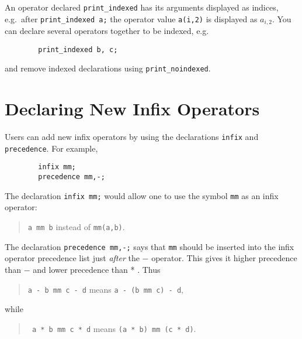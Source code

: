 \hypertarget{command:PRINT_INDEXED}{}\hypertarget{command:PRINT_NOINDEXED}{}

An operator declared
\texttt{print\_indexed} has
its arguments displayed as indices, e.g.\ after
\texttt{print\_indexed~a;} the operator value \texttt{a(i,2)} is
displayed as \(a_{i,2}\).  You can declare several operators together
to be indexed, e.g.
\begin{verbatim}
        print_indexed b, c;
\end{verbatim}
and remove indexed declarations using
\texttt{print\_noindexed}.


\section{Declaring New Infix Operators}
\hypertarget{command:INFIX}{}
\hypertarget{command:PRECEDENCE}{}

Users can add new infix operators by using the declarations
\texttt{infix} and
\texttt{precedence}.
For example,
\begin{verbatim}
        infix mm;
        precedence mm,-;
\end{verbatim}
The declaration \texttt{infix mm;} would allow one to use the symbol
\texttt{mm} as an infix operator:
\begin{quote}
\hspace{0.2in} \texttt{a mm b} \hspace{0.3in} instead of \hspace{0.3in}
\texttt{mm(a,b)}.
\end{quote}

The declaration \texttt{precedence mm,-;} says that \texttt{mm} should be
inserted into the infix operator precedence list just \emph{after}
the $-$ operator.  This gives it higher precedence than $-$ and lower
precedence than * .  Thus

\begin{quote}
\hspace{0.2in}\texttt{a - b mm c - d}\hspace{.3in} means \hspace{.3in}
\texttt{a - (b mm c) - d},
\end{quote}
while
\begin{quote}
\hspace{0.2in}\texttt{  a * b mm c * d}\hspace{.3in} means \hspace{.3in}
\texttt{(a * b) mm (c * d)}.
\end{quote}

